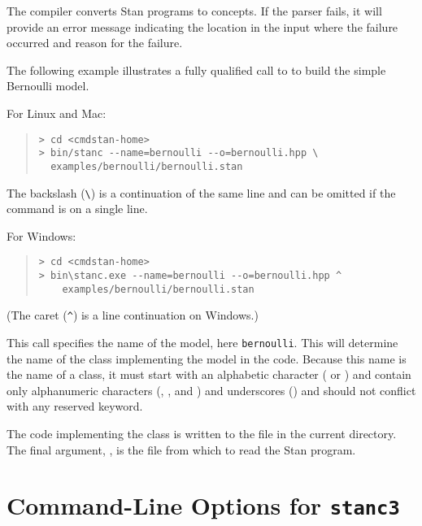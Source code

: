 The \stanc compiler converts Stan programs to \Cpp concepts.
If the parser fails, it will provide an error
message indicating the location in the input where the failure
occurred and reason for the failure.

The following example illustrates a fully qualified call to \stanc
to build the simple Bernoulli model. 

For Linux and Mac:
%
\begin{quote}
\begin{Verbatim}[fontshape=sl]
> cd <cmdstan-home>
> bin/stanc --name=bernoulli --o=bernoulli.hpp \
  examples/bernoulli/bernoulli.stan 
\end{Verbatim}
\end{quote}
%
The backslash (\Verb|\|) is a continuation of the same line and can be
omitted if the command is on a single line.

For Windows:
%
\begin{quote}
\begin{Verbatim}[fontshape=sl]
> cd <cmdstan-home>
> bin\stanc.exe --name=bernoulli --o=bernoulli.hpp ^
    examples/bernoulli/bernoulli.stan 
\end{Verbatim}
\end{quote}
%
(The caret (\Verb|^|) is a line continuation on Windows.)

This call specifies the name of the model, here {\tt bernoulli}.
This will determine the name of the class implementing the model in
the \Cpp code.  Because this name is the name of a \Cpp class, it must
start with an alphabetic character ( or ) and
contain only alphanumeric characters (\code{a--z}, \code{A--Z}, and
\code{0--9}) and underscores (\code{\_}) and should not conflict with
any \Cpp reserved keyword.  

The \Cpp code implementing the class is written to the file
 in the current directory.  The final argument,
\code{bernoulli.stan}, is the file from which to read the Stan program.

\section{Command-Line Options for {\tt\bfseries stanc3}}

